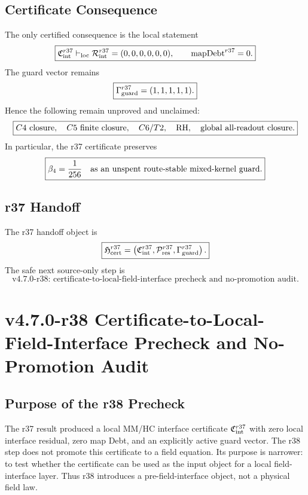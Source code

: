 \subsection{Certificate Consequence}
\label{subsec:r37-certificate-consequence}

The only certified consequence is the local statement
\[
\boxed{
\mathfrak C_{\rm int}^{r37}
\vdash_{\rm loc}
\mathcal R_{\rm int}^{r37}=(0,0,0,0,0,0),
\qquad
\mathrm{mapDebt}^{r37}=0.
}
\]
The guard vector remains
\[
\boxed{
\Gamma_{\rm guard}^{r37}=(1,1,1,1,1).
}
\]
Hence the following remain unproved and unclaimed:
\[
\boxed{
C4\hbox{ closure},\quad
C5\hbox{ finite closure},\quad
C6/T2,\quad
\mathrm{RH},\quad
\hbox{global all-readout closure}.
}
\]
In particular, the r37 certificate preserves
\[
\boxed{
\beta_4={1\over256}\quad\hbox{as an unspent route-stable mixed-kernel guard.}
}
\]

\subsection{r37 Handoff}
\label{subsec:r37-handoff}

The r37 handoff object is
\[
\boxed{
\mathfrak H_{\rm cert}^{r37}
=
\left(
\mathfrak C_{\rm int}^{r37},
\mathcal P_{\rm res}^{r37},
\Gamma_{\rm guard}^{r37}
\right).
}
\]
The safe next source-only step is
\[
\boxed{
\text{v4.7.0-r38: certificate-to-local-field-interface precheck and no-promotion audit.}
}
\]


\section{v4.7.0-r38 Certificate-to-Local-Field-Interface Precheck and No-Promotion Audit}
\label{sec:v470-r38-certificate-field-interface-precheck}

\subsection{Purpose of the r38 Precheck}
\label{subsec:r38-purpose}

The r37 result produced a local MM/HC interface certificate
\(\mathfrak C_{\rm int}^{r37}\) with zero local interface residual, zero map
Debt, and an explicitly active guard vector.  The r38 step does not promote this
certificate to a field equation.  Its purpose is narrower: to test whether the
certificate can be used as the input object for a local field-interface layer.
Thus r38 introduces a pre-field-interface object, not a physical field law.

